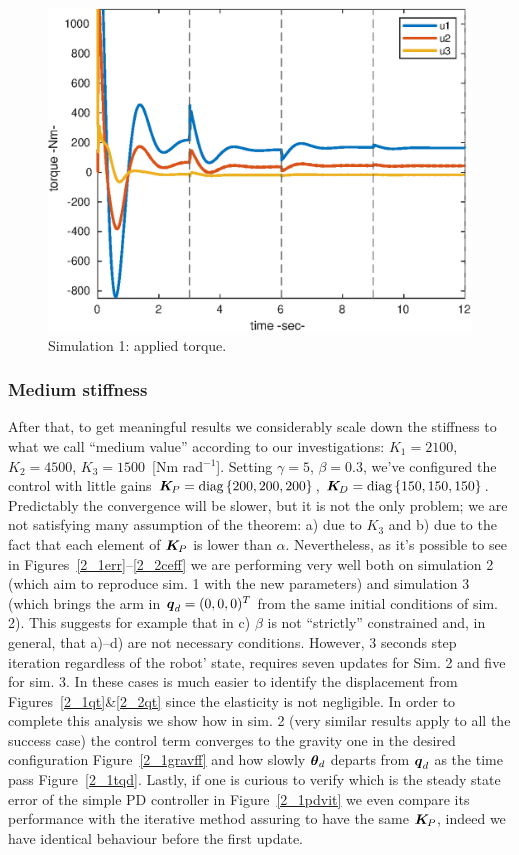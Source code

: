 \begin{figure}[h!]
\hspace{-0.1cm}\centerline{\includegraphics[scale=0.65]{figures/1_1_effort.eps}}
\caption{\label{1_1ceff}
Simulation 1: applied torque.}
\end{figure}
\clearpage
\subsubsection{Medium stiffness}
After that, to get meaningful results we considerably scale down the stiffness to what we call ``medium value'' according to our investigations: $K_1 = 2100$, $K_2 = 4500$, $K_3 = 1500$~[Nm rad$^{-1}$]. Setting $\gamma = 5$, $\beta = 0.3$, we've configured the control with little gains $\boldsymbol{K}_{\!P} = \mbox{diag}\left\{200, 200, 200\right\}$,
$\boldsymbol{K}_{\!D}=\mbox{diag}\left\{150,150,150\right\}$. Predictably the convergence will be slower, but it is not the only problem; we are not satisfying many assumption of the theorem: a) due to $K_3$ and b) due to the fact that each element of $\boldsymbol{K}_{\!P}$ is lower than $\alpha$. Nevertheless, as it's possible to see in Figures~\ref{2_1err}--\ref{2_2ceff} we are performing very well both on simulation 2 (which aim to reproduce sim. 1 with the new parameters) and simulation 3 (which brings the arm in ${\boldsymbol{q}}_d=(0,0,0)^T$ from the same initial conditions of sim. 2). This suggests for example that in c) $\beta$ is not ``strictly'' constrained and, in general, that a)--d) are not necessary conditions.  
However, 3 seconds step iteration regardless of the robot’ state, requires seven updates for Sim. 2 and five for sim. 3. In these cases is much easier to identify the displacement from Figures~\ref{2_1qt}\&\ref{2_2qt} since the elasticity is not negligible.
In order to complete this analysis we show how in sim. 2 (very similar results apply to all the success case) the control term converges to the gravity one in the desired configuration Figure~\ref{2_1gravff} and how slowly $\boldsymbol{\theta}_d$ departs from ${\boldsymbol{q}}_d$ as the time pass Figure~\ref{2_1tqd}. Lastly, if one is curious to verify which is the steady state error of the simple PD controller in Figure~\ref{2_1pdvit} we even compare its performance with the iterative method assuring to have the same $\boldsymbol{K}_{\!P}$, indeed we have identical behaviour before the first update.

